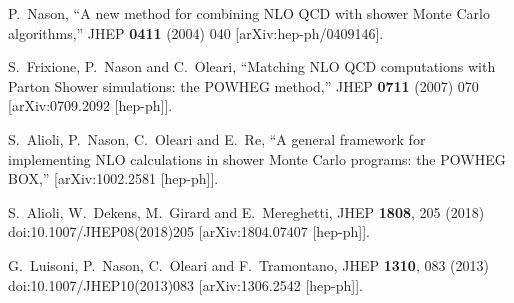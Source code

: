 \documentclass[paper]{JHEP3}
\begin{document}
\begin{thebibliography}{10}

  P.~Nason,
  ``A new method for combining NLO QCD with shower Monte Carlo algorithms,''
  JHEP {\bf 0411} (2004) 040
  [arXiv:hep-ph/0409146].

  S.~Frixione, P.~Nason and C.~Oleari,
``Matching NLO QCD computations with Parton Shower simulations: the POWHEG
method,''
  JHEP {\bf 0711} (2007) 070
  [arXiv:0709.2092 [hep-ph]].

  S.~Alioli, P.~Nason, C.~Oleari and E.~Re,
``A general framework for implementing NLO calculations in shower Monte Carlo
  programs: the POWHEG BOX,''
  [arXiv:1002.2581 [hep-ph]].

  S.~Alioli, W.~Dekens, M.~Girard and E.~Mereghetti,
  JHEP {\bf 1808}, 205 (2018)
  doi:10.1007/JHEP08(2018)205
  [arXiv:1804.07407 [hep-ph]].
  
  
  G.~Luisoni, P.~Nason, C.~Oleari and F.~Tramontano,
  JHEP {\bf 1310}, 083 (2013)
  doi:10.1007/JHEP10(2013)083
  [arXiv:1306.2542 [hep-ph]].


  
  

\end{thebibliography}
\end{document}
